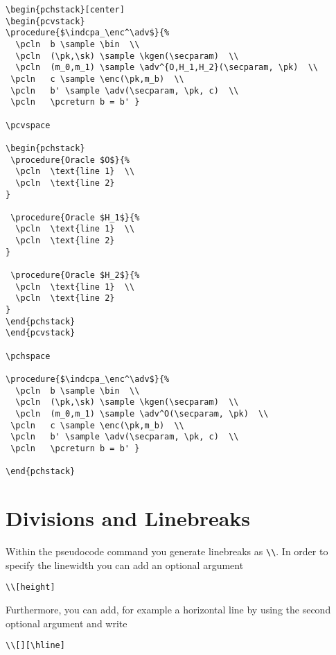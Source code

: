 \documentclass[a4paper]{report}
\begin{document}
\begin{lstlisting}
\begin{pchstack}[center]
\begin{pcvstack}
\procedure{$\indcpa_\enc^\adv$}{%
  \pcln  b \sample \bin  \\
  \pcln  (\pk,\sk) \sample \kgen(\secparam)  \\
  \pcln  (m_0,m_1) \sample \adv^{O,H_1,H_2}(\secparam, \pk)  \\
 \pcln   c \sample \enc(\pk,m_b)  \\
 \pcln   b' \sample \adv(\secparam, \pk, c)  \\
 \pcln   \pcreturn b = b' }

\pcvspace

\begin{pchstack}
 \procedure{Oracle $O$}{%
  \pcln  \text{line 1}  \\
  \pcln  \text{line 2}  
}

 \procedure{Oracle $H_1$}{%
  \pcln  \text{line 1}  \\
  \pcln  \text{line 2}  
}

 \procedure{Oracle $H_2$}{%
  \pcln  \text{line 1}  \\
  \pcln  \text{line 2}  
}
\end{pchstack}
\end{pcvstack}

\pchspace

\procedure{$\indcpa_\enc^\adv$}{%
  \pcln  b \sample \bin  \\
  \pcln  (\pk,\sk) \sample \kgen(\secparam)  \\
  \pcln  (m_0,m_1) \sample \adv^O(\secparam, \pk)  \\
 \pcln   c \sample \enc(\pk,m_b)  \\
 \pcln   b' \sample \adv(\secparam, \pk, c)  \\
 \pcln   \pcreturn b = b' }

\end{pchstack}
\end{lstlisting}

\section{Divisions and Linebreaks}
Within the pseudocode command you generate linebreaks as \lstinline$\\$. In order to specify the linewidth you can add an optional argument
\begin{lstlisting}
\\[height]
\end{lstlisting}
Furthermore, you can add, for example a horizontal line by using the second optional argument and write
\begin{lstlisting}
\\[][\hline]
\end{lstlisting}
\end{document}
